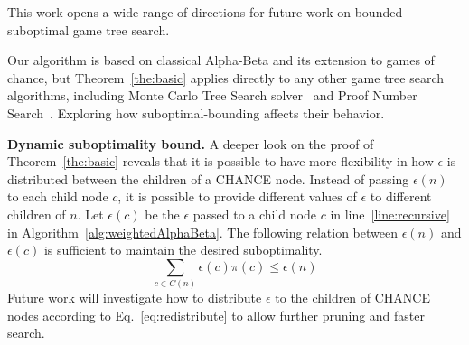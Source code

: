 \documentclass[letterpaper]{article} %
\newtheorem{theorem}{Theorem}
\newcommand{\MM}{\mathit{V}}
\newcommand{\pess}{\mathit{L}}
\newcommand{\opti}{\mathit{U}}
\newcommand{\rootnode}{\mathit{n_1}}
\begin{document}
This work opens a wide range of directions for future work on bounded suboptimal game tree search. 

 Our algorithm is based on classical Alpha-Beta and its extension to games of chance, but Theorem~\ref{the:basic} applies directly to any other game tree search algorithms, including Monte Carlo Tree Search solver~\cite{lanctot2013monte} and Proof Number Search~\cite{allis1994proof}. Exploring how suboptimal-bounding affects their behavior. 


\noindent \textbf{Dynamic suboptimality bound.}
A deeper look on the proof of Theorem~\ref{the:basic} reveals that it is possible to have more flexibility in how $\epsilon$ is distributed between the children of a CHANCE node. Instead of passing $\epsilon(n)$ to each child node $c$, it is possible to provide different values of $\epsilon$ to different children of $n$. 
Let $\epsilon(c)$ be the $\epsilon$ passed to a child node $c$ in line~\ref{line:recursive} in Algorithm~\ref{alg:weightedAlphaBeta}. The following relation between $\epsilon(n)$ and $\epsilon(c)$ is sufficient to maintain the desired suboptimality. 
\begin{equation}
  \sum_{c\in C(n)} \epsilon(c) \pi(c) \leq \epsilon(n) \label{eq:redistribute}
\end{equation}
Future work will investigate how to distribute  $\epsilon$ to the children of CHANCE nodes according to Eq.~\eqref{eq:redistribute} to allow further pruning and faster search. 
\end{document}
